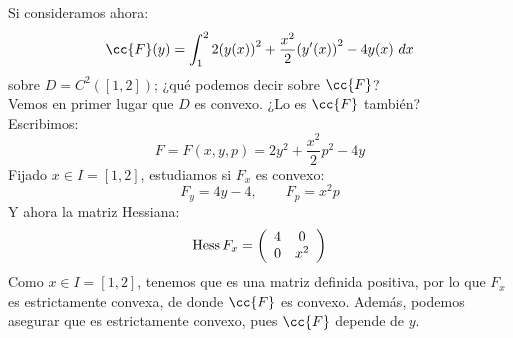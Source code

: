 \begin{ejemplo}
    Si consideramos ahora:
    \begin{equation*}
        \cc{F}(y) = \int_{1}^{2} 2{(y(x))}^{2} + \frac{x^2}{2}{(y'(x))}^{2}-4y(x)~dx 
    \end{equation*}
    sobre $D = C^2([1,2])$; ¿qué podemos decir sobre $\cc{F}$?\\

    \noindent
    Vemos en primer lugar que $D$ es convexo. ¿Lo es $\cc{F}$ también?\\

    \noindent
    Escribimos:
    \begin{equation*}
        F=F(x,y,p) = 2y^2 + \frac{x^2}{2}p^2 - 4y
    \end{equation*}
    Fijado $x\in I=[1,2]$, estudiamos si $F_x$ es convexo:
    \begin{equation*}
        F_y = 4y - 4, \qquad F_p = x^2p
    \end{equation*}
    Y ahora la matriz Hessiana:
    \begin{equation*}
        \operatorname{Hess} F_x = \left(\begin{array}{cc}
            4 & 0 \\
            0 & x^2 
        \end{array}\right)
    \end{equation*}
    Como $x\in I = [1,2]$, tenemos que es una matriz definida positiva, por lo que $F_x$ es estrictamente convexa, de donde $\cc{F}$ es convexo. Además, podemos asegurar que es estrictamente convexo, pues $\cc{F}$ depende de $y$.\\


\end{ejemplo}
